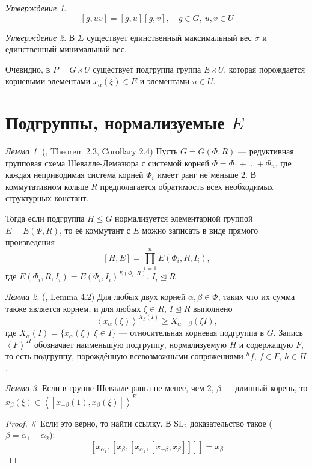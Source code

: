 \documentclass[10pt]{article}
\theoremstyle{remark}
\newtheorem{prop}{Утверждение}
\newtheorem{lm}{Лемма}
\renewcommand{\le}{\leqslant}
\renewcommand{\ge}{\geqslant}
\begin{document}
\begin{prop}
  $$[g,uv] = [g,u][g,v], \quad g \in G, \ u,v \in U $$
\end{prop}

\begin{prop}
  В $\Sigma$ существует единственный максимальный вес $\widetilde\sigma$ и единственный минимальный вес.
\end{prop}

Очевидно, в $P = G \rightthreetimes U $ существует подгруппа группа $E \rightthreetimes U$, которая порождается корневыми элементами $x_\alpha(\xi) \in E$ и элементами $u \in U$.

\section{Подгруппы, нормализуемые $E$}

\begin{lm}(\citep{Stavrova2009}, Theorem 2.3, Corollary 2.4)
  \label{directproduct}
  Пусть $G = G(\Phi, R)$ --- редуктивная групповая схема Шевалле-Демазюра
  с системой корней $\Phi = \Phi_1 + \ldots + \Phi_n$, где каждая неприводимая система корней $\Phi_i$ имеет ранг не меньше $2$. В коммутативном кольце $R$ предполагается обратимость всех необходимых структурных констант.
  
  Тогда если подгруппа $H \le G$ нормализуется элементарной группой $E = E(\Phi,R)$, то её коммутант с $E$ можно записать в виде прямого произведения
  $$ [H, E] = \prod_{i=1}^n E(\Phi_i,R,I_i), $$
  где $E(\Phi_i,R,I_i) = E(\Phi_i,I_i)^{E(\Phi_i,R)}$, $I_i \trianglelefteq R$
\end{lm}

\begin{lm}(\citep{Stavrova2009}, Lemma 4.2)
  \label{transitivity}
  Для любых двух корней $\alpha, \beta \in \Phi$, таких что их сумма также является корнем, и для любых  $\xi \in R$, $I \trianglelefteq R$ выполнено
  $$ \left< x_\alpha(\xi) \right>^{X_\beta(I)} \ge X_{\alpha + \beta}(\xi I), $$  
  где $X_\alpha(I) = \{x_\alpha(\xi) | \xi \in I\}$ --- относительная корневая подгруппа в $G$. Запись $\left<F\right>^H$ обозначает наименьшую подгруппу, нормализуемую $H$ и содержащую $F$, то есть подгруппу, порождённую всевозможными сопряжениями $^hf$, $f \in F$, $h \in H$.
\end{lm}

\begin{lm}\label{oppositecommutator}
Если в группе Шевалле ранга не менее, чем $2$, $\beta$ --- длинный корень, то $x_\beta(\xi) \in \left<[x_{-\beta}(1),x_\beta(\xi)]\right>^E$
\end{lm}
\begin{proof}
\# Если это верно, то найти ссылку. В $\mathrm{SL}_2$ доказательство такое ($\beta=\alpha_1+\alpha_2$): 
$$
[x_{\alpha_1},[x_\beta,[x_{\alpha_2},[x_{-\beta},x_\beta]]]]=x_\beta
$$

\end{proof}
\end{document}
